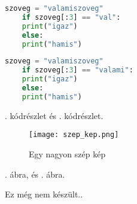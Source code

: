 \begin{lstlisting}[caption={Hogyan ne írjunk kódot},label={lst:stringstartswith}, language={Python}]
	szoveg = "valamiszoveg"
	if szoveg[:3] == "val":
	print("igaz")
	else:
	print("hamis")
\end{lstlisting}

\lipsum[1]

\begin{lstlisting}[caption={Miből lehet probléma},label={lst:stringstartswith2}, language={Python}]
	szoveg = "valamiszoveg"
	if szoveg[:3] == "valami":
	print("igaz")
	else:
	print("hamis")
\end{lstlisting}

. kódrészlet és . kódrészlet.


\begin{figure}[!htbp]
	\caption{Egy nagyon szép kép}
	\label{fig:szepkep}
	\centering
	\texttt{[image: szep\_kep.png]}
\end{figure}

. ábra, és . ábra.

Ez még nem készült.. 